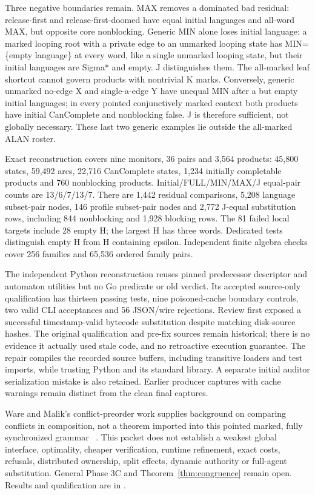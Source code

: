 \documentclass[11pt,a4paper]{article}
\theoremstyle{definition}
\theoremstyle{remark}
\begin{document}
Three negative boundaries remain. MAX removes a dominated bad residual: release-first and release-first-doomed have equal initial languages and all-word MAX, but opposite core nonblocking. Generic MIN alone loses initial language: a marked looping root with a private edge to an unmarked looping state has MIN=\{empty language\} at every word, like a single unmarked looping state, but their initial languages are Sigma* and empty. J distinguishes them. The all-marked leaf shortcut cannot govern products with nontrivial K marks. Conversely, generic unmarked no-edge X and single-a-edge Y have unequal MIN after a but empty initial languages; in every pointed conjunctively marked context both products have initial CanComplete and nonblocking false. J is therefore sufficient, not globally necessary. These last two generic examples lie outside the all-marked ALAN roster.

Exact reconstruction covers nine monitors, 36 pairs and 3,564 products: 45,800 states, 59,492 arcs, 22,716 CanComplete states, 1,234 initially completable products and 760 nonblocking products. Initial/FULL/MIN/MAX/J equal-pair counts are 13/6/7/13/7. There are 1,442 residual comparisons, 5,208 language subset-pair nodes, 146 profile subset-pair nodes and 2,772 J-equal substitution rows, including 844 nonblocking and 1,928 blocking rows. The 81 failed local targets include 28 empty H; the largest H has three words. Dedicated tests distinguish empty H from H containing epsilon. Independent finite algebra checks cover 256 families and 65,536 ordered family pairs.

The independent Python reconstruction reuses pinned predecessor descriptor and automaton utilities but no Go predicate or old verdict. Its accepted source-only qualification has thirteen passing tests, nine poisoned-cache boundary controls, two valid CLI acceptances and 56 JSON/wire rejections. Review first exposed a successful timestamp-valid bytecode substitution despite matching disk-source hashes. The original qualification and pre-fix sources remain historical; there is no evidence it actually used stale code, and no retroactive execution guarantee. The repair compiles the recorded source buffers, including transitive loaders and test imports, while trusting Python and its standard library. A separate initial auditor serialization mistake is also retained. Earlier producer captures with cache warnings remain distinct from the clean final captures.

Ware and Malik's conflict-preorder work supplies background on comparing conflicts in composition, not a theorem imported into this pointed marked, fully synchronized grammar ~\cite{ware2011conflict}. This packet does not establish a weakest global interface, optimality, cheaper verification, runtime refinement, exact costs, refusals, distributed ownership, split effects, dynamic authority or full-agent substitution. General Phase 3C and Theorem~\ref{thm:congruence} remain open. Results and qualification are in .
\end{document}
